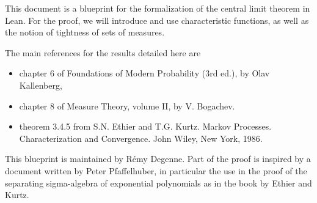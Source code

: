 
This document is a blueprint for the formalization of the central limit theorem in Lean.
For the proof, we will introduce and use characteristic functions, as well as the notion of tightness of sets of measures.

The main references for the results detailed here are
\begin{itemize}
	\item chapter 6 of Foundations of Modern Probability (3rd ed.), by Olav Kallenberg,
	\item chapter 8 of Measure Theory, volume II, by V. Bogachev.
	\item theorem 3.4.5 from S.N. Ethier and T.G. Kurtz. Markov Processes. Characterization and Convergence. John Wiley, New York, 1986.
\end{itemize}

This blueprint is maintained by R\'emy Degenne. Part of the proof is inspired by a document written by Peter Pfaffelhuber, in particular the use in the proof of the separating sigma-algebra of exponential polynomials as in the book by Ethier and Kurtz.






